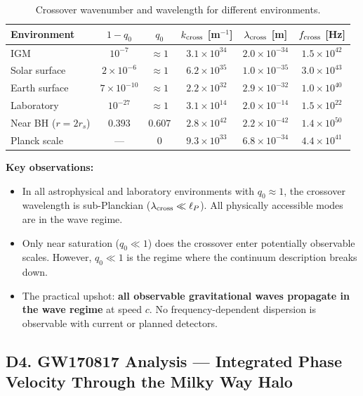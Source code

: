 \documentclass[reprint]{revtex4-2}
\begin{document}
\begin{table}[h]
\caption{Crossover wavenumber and wavelength for different environments.}
\label{tab:kcross}
\small\setlength{\tabcolsep}{3pt}
\begin{tabular}{lccccc}
\toprule
Environment & $1-q_0$ & $q_0$ & $k_{\rm cross}$ [m$^{-1}$] & $\lambda_{\rm cross}$ [m] & $f_{\rm cross}$ [Hz] \\
\midrule
IGM & $10^{-7}$ & $\approx 1$ & $3.1{\times}10^{34}$ & $2.0{\times}10^{-34}$ & $1.5{\times}10^{42}$ \\
Solar surface & $2{\times}10^{-6}$ & $\approx 1$ & $6.2{\times}10^{35}$ & $1.0{\times}10^{-35}$ & $3.0{\times}10^{43}$ \\
Earth surface & $7{\times}10^{-10}$ & $\approx 1$ & $2.2{\times}10^{32}$ & $2.9{\times}10^{-32}$ & $1.0{\times}10^{40}$ \\
Laboratory & $10^{-27}$ & $\approx 1$ & $3.1{\times}10^{14}$ & $2.0{\times}10^{-14}$ & $1.5{\times}10^{22}$ \\
Near BH ($r{=}2r_s$) & $0.393$ & $0.607$ & $2.8{\times}10^{42}$ & $2.2{\times}10^{-42}$ & $1.4{\times}10^{50}$ \\
Planck scale & --- & $0$ & $9.3{\times}10^{33}$ & $6.8{\times}10^{-34}$ & $4.4{\times}10^{41}$ \\
\bottomrule
\end{tabular}
\end{table}

\textbf{Key observations:}
\begin{itemize}
\item In all astrophysical and laboratory environments with $q_0\approx 1$, the crossover wavelength is sub-Planckian ($\lambda_{\rm cross} \ll \ell_P$). All physically accessible modes are in the wave regime.
\item Only near saturation ($q_0 \ll 1$) does the crossover enter potentially observable scales. However, $q_0 \ll 1$ is the regime where the continuum description breaks down.
\item The practical upshot: \textbf{all observable gravitational waves propagate in the wave regime} at speed $c$. No frequency-dependent dispersion is observable with current or planned detectors.
\end{itemize}

\subsection{D4. GW170817 Analysis --- Integrated Phase Velocity Through the Milky Way Halo}
\end{document}
